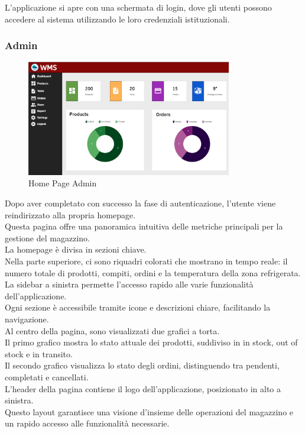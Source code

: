 L'applicazione si apre con una schermata di login, dove gli utenti possono accedere al sistema utilizzando le loro
credenziali istituzionali.
\newpage
\subsubsection{Admin}

\begin{figure}[H]
    \centering
    \includegraphics[width=0.8\textwidth]{document/sections/img/homePageAdmin.png}
    \caption{Home Page Admin}
    \label{fig:homePageAdmin}
\end{figure}

Dopo aver completato con successo la fase di autenticazione, l'utente viene reindirizzato alla propria homepage.\\
Questa pagina offre una panoramica intuitiva delle metriche principali per la gestione del magazzino.\\
La homepage è divisa in sezioni chiave.\\ Nella parte superiore, ci sono riquadri colorati che mostrano in tempo reale:
il numero totale di prodotti, compiti, ordini e la temperatura della zona refrigerata.\\
La sidebar a sinistra permette l'accesso rapido alle varie funzionalità dell'applicazione.\\
Ogni sezione è accessibile tramite icone e descrizioni chiare, facilitando la navigazione.\\
Al centro della pagina, sono visualizzati due grafici a torta.\\ Il primo grafico mostra lo stato attuale dei prodotti,
suddiviso in in stock, out of stock e in transito.\\ Il secondo grafico visualizza lo stato degli ordini, distinguendo
tra pendenti, completati e cancellati.\\
L'header della pagina contiene il logo dell'applicazione, posizionato in alto a sinistra.\\
Questo layout garantisce una visione d'insieme delle operazioni del magazzino e un rapido accesso alle funzionalità
necessarie.

